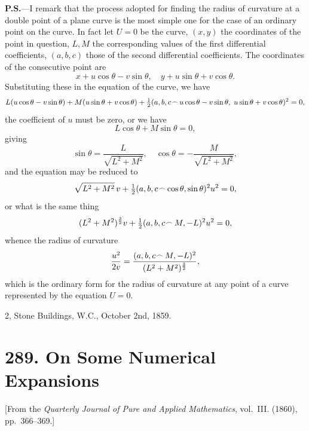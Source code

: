 \documentclass[11pt,a4paper]{article}
\theoremstyle{plain}
\begin{document}
\textbf{P.S.}---I remark that the process adopted for finding the radius of curvature at a double point of a plane curve is the most simple one for the case of an ordinary point on the curve. In fact let $U = 0$ be the curve, $(x, y)$ the coordinates of the point in question, $L, M$ the corresponding values of the first differential coefficients, $(a, b, c)$ those of the second differential coefficients. The coordinates of the consecutive point are
\[
x + u\cos\theta - v\sin\theta,\quad y + u\sin\theta + v\cos\theta.
\]
Substituting these in the equation of the curve, we have
\[
L(u\cos\theta - v\sin\theta) + M(u\sin\theta + v\cos\theta) + \tfrac{1}{2}(a, b, c \mathbin{\vcenter{\hbox{$\scriptstyle\!\frown$}}} u\cos\theta - v\sin\theta,\; u\sin\theta + v\cos\theta)^2 = 0,
\]
the coefficient of $u$ must be zero, or we have
\[
L\cos\theta + M\sin\theta = 0,
\]
giving
\[
\sin\theta = \frac{L}{\sqrt{L^2 + M^2}},\quad \cos\theta = -\frac{M}{\sqrt{L^2 + M^2}},
\]
and the equation may be reduced to
\[
\sqrt{L^2 + M^2}\,v + \tfrac{1}{2}(a, b, c \mathbin{\vcenter{\hbox{$\scriptstyle\!\frown$}}} \cos\theta, \sin\theta)^2 u^2 = 0,
\]
or what is the same thing
\[
(L^2 + M^2)^{\frac{3}{2}} v + \tfrac{1}{2}(a, b, c \mathbin{\vcenter{\hbox{$\scriptstyle\!\frown$}}} M, -L)^2 u^2 = 0,
\]
whence the radius of curvature
\[
\frac{u^2}{2v} = \frac{(a, b, c \mathbin{\vcenter{\hbox{$\scriptstyle\!\frown$}}} M, -L)^2}{(L^2 + M^2)^{\frac{3}{2}}},
\]
which is the ordinary form for the radius of curvature at any point of a curve represented by the equation $U = 0$.

\hfill 2, Stone Buildings, W.C., October 2nd, 1859.


\newpage
\section*{289. On Some Numerical Expansions}
\label{sec:289}

[From the \textit{Quarterly Journal of Pure and Applied Mathematics}, vol.~III. (1860), pp.~366--369.]
\end{document}
